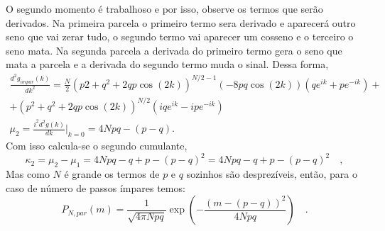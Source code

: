 \documentclass[12pt]{article}
\begin{document}
O segundo momento é trabalhoso e por isso, observe os termos que serão derivados. Na primeira parcela o primeiro termo sera derivado e aparecerá outro seno que vai zerar tudo, o segundo termo vai aparecer um cosseno e o terceiro o seno mata. Na segunda parcela a derivada do primeiro termo gera o seno que mata a parcela e a derivada do segundo termo muda o sinal. Dessa forma,
\begin{equation}
\begin{split}
\frac{d^2g_{impar}(k)}{dk^2} = \frac{N}{2}\left(p2 + q^2 + 2qp\cos(2k)\right)^{N/2 - 1}\left(-8pq\cos(2k)\right)(qe^{ik} + pe^{-ik}) + \\
+ (p^2 + q^2 + 2qp\cos(2k))^{N/2}(iqe^{ik}-ipe^{-ik})
\\
\mu_2 = \frac{i^2d^2g(k)}{dk}\Big\rvert_{k=0} = 4Npq - (p -q). 
\end{split}
\end{equation}
Com isso calcula-se o segundo cumulante,
\begin{equation}
\kappa_2 = \mu_2 - \mu_1 = 4Npq - q + p - (p - q)^2 = 4Npq - q + p -(p - q)^2 \quad, 
\end{equation}
Mas como $N$ é grande os termos de $p$ e $q$ sozinhos são desprezíveis, então, para o caso de número de passos ímpares temos:
\begin{equation}
P_{N, par}(m) = \frac{1}{\sqrt{4\pi Npq}}\exp{\left(-\frac{(m-(p-q))^2}{4Npq}\right)}\quad.
\end{equation}  
\end{document}
